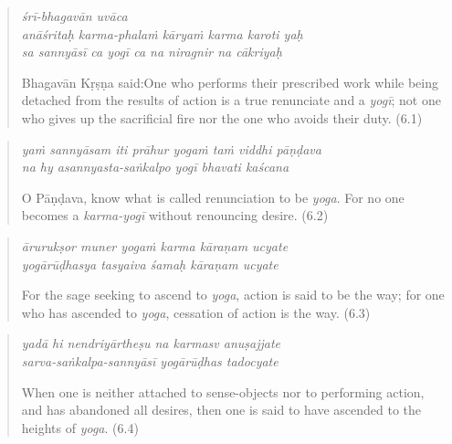 \documentclass[12pt, twoside, openright]{memoir}
\begin{document}
\par
\begin{verse}
\textit{śrī-bhagavān uvāca} \\
\textit{anāśritaḥ karma-phalaṁ kāryaṁ karma karoti yaḥ} \\
\textit{sa sannyāsī ca yogī ca na niragnir na cākriyaḥ}

\noindent \quad Bhagavān Kṛṣṇa said:\linebreak One who performs their prescribed work while being detached from the results of action is a true renunciate and a \textit{yogī}; not one who gives up the sacrificial fire nor the one who avoids their duty. (6.1)
\end{verse}
\par



\par
\begin{verse}
\textit{yaṁ sannyāsam iti prāhur yogaṁ taṁ viddhi pāṇḍava} \\
\textit{na hy asannyasta-saṅkalpo yogī bhavati kaścana}

\noindent O Pāṇḍava, know what is called renunciation to be \textit{yoga}. For no one becomes a \textit{karma-yogī} without renouncing desire. (6.2)
\end{verse}
\par



\par
\begin{verse}
\textit{ārurukṣor muner yogaṁ karma kāraṇam ucyate} \\
\textit{yogārūḍhasya tasyaiva śamaḥ kāraṇam ucyate}

\noindent For the sage seeking to ascend to \textit{yoga}, action is said to be the way; for one who has ascended to \textit{yoga}, cessation of action is the way. (6.3)
\end{verse}
\par



\par
\begin{verse}
\textit{yadā hi nendriyārtheṣu na karmasv anuṣajjate} \\
\textit{sarva-saṅkalpa-sannyāsī yogārūḍhas tadocyate}

\noindent When one is neither attached to sense-objects nor to performing action, and has abandoned all desires, then one is said to have ascended to the heights of \textit{yoga}. (6.4)
\end{verse}
\par
\end{document}
